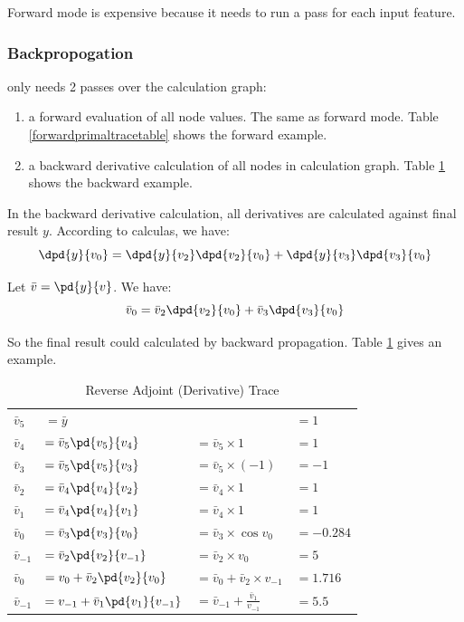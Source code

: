 Forward mode is expensive because it needs to run a pass for each input feature.


\subsubsection{Backpropogation}

 only needs 2 passes over the calculation graph:
\begin{enumerate}
    \item a forward evaluation of all node values. The same as forward mode. Table \ref{forwardprimaltracetable} shows the forward example.
    \item a backward derivative calculation of all nodes in calculation graph. Table \ref{reverseadjointtrace} shows the backward example.
\end{enumerate}

In the backward derivative calculation, all derivatives are calculated against final result $y$. According to calculas, we have:
\begin{equation}
    \dpd{y}{v_0} = \dpd{y}{v_2} \dpd{v_2}{v_0} + \dpd{y}{v_3} \dpd{v_3}{v_0}
\end{equation}

Let $\bar{v} = \pd{y}{v}$. We have:
\begin{equation}
    \bar{v}_0 = \bar{v}_2 \dpd{v_2}{v_0} + \bar{v}_3 \dpd{v_3}{v_0}
\end{equation}

So the final result could calculated by backward propagation. Table \ref{reverseadjointtrace} gives an example.

\begin{table}[H]
\centering
    \begin{tabular}{llll}
        $\bar{v}_5$ & $=\bar{y}$ && $= 1$ \\
        $\bar{v}_4$ & $=\bar{v}_5 \pd{v_5}{v_4}$ & $=\bar{v}_5 \times 1$ & $=1$ \\
        $\bar{v}_3$ & $=\bar{v}_5 \pd{v_5}{v_3}$ & $=\bar{v}_5 \times (-1)$ & $=-1$ \\
        $\bar{v}_2$ & $=\bar{v}_4 \pd{v_4}{v_2}$ & $=\bar{v}_4 \times 1$ & $=1$ \\
        $\bar{v}_1$ & $=\bar{v}_4 \pd{v_4}{v_1}$ & $=\bar{v}_4 \times 1$ & $=1$ \\
        $\bar{v}_0$ & $=\bar{v}_3 \pd{v_3}{v_0}$ & $=\bar{v}_3 \times \cos{v_0}$ & $=-0.284$ \\
        $\bar{v}_{-1}$ & $=\bar{v}_2 \pd{v_2}{v_{-1}}$ & $=\bar{v}_2 \times v_0$ & $=5$ \\
        $\bar{v}_0$ & $=v_0 + \bar{v}_2 \pd{v_2}{v_0}$ & $=\bar{v}_0 +\bar{v}_2 \times v_{-1}$ & $=1.716$ \\
        $\bar{v}_{-1}$ & $=v_{-1} + \bar{v}_1 \pd{v_1}{v_{-1}}$ & $=\bar{v}_{-1} + \frac{\bar{v}_1}{v_{-1}}$ & $=5.5$ \\
    \end{tabular}
\caption{Reverse Adjoint (Derivative) Trace}
\label{reverseadjointtrace}
\end{table}






